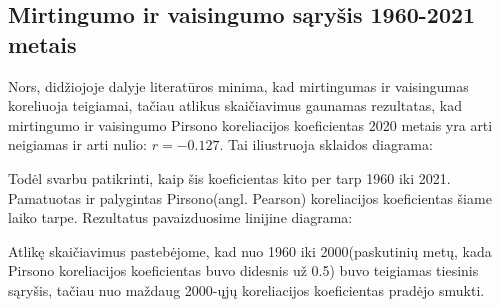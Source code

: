 \subsection{Mirtingumo ir vaisingumo sąryšis 1960-2021 metais}
Nors, didžiojoje dalyje literatūros minima, kad mirtingumas ir vaisingumas koreliuoja teigiamai, tačiau atlikus skaičiavimus gaunamas rezultatas, kad mirtingumo ir vaisingumo Pirsono koreliacijos koeficientas 2020 metais yra arti neigiamas ir arti nulio: $r = -0.127$. Tai iliustruoja sklaidos diagrama:

Todėl svarbu patikrinti, kaip šis koeficientas kito per tarp 1960 iki 2021. Pamatuotas ir palygintas Pirsono(angl. Pearson) koreliacijos koeficientas šiame laiko tarpe. Rezultatus pavaizduosime linijine diagrama:

Atlikę skaičiavimus pastebėjome, kad nuo 1960 iki 2000(paskutinių metų, kada Pirsono koreliacijos koeficientas buvo didesnis už 0.5) buvo teigiamas tiesinis sąryšis, tačiau nuo maždaug 2000-ųjų koreliacijos koeficientas pradėjo smukti. 